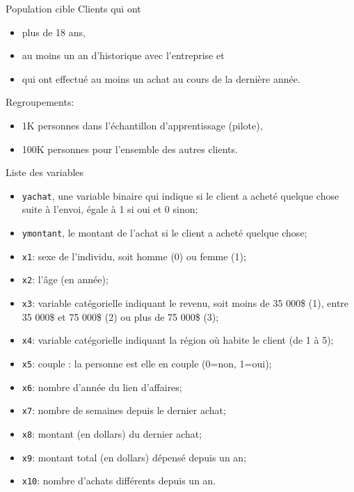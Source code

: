 \documentclass[
  ignorenonframetext,
]{beamer}
\providecommand{\tightlist}{%
  \setlength{\itemsep}{0pt}\setlength{\parskip}{0pt}}
\begin{document}
\begin{frame}{Population cible}
\protect{}\label{population-cible}
Clients qui ont

\begin{itemize}
\tightlist
\item
  plus de 18 ans,
\item
  au moins un an d'historique avec l'entreprise et
\item
  qui ont effectué au moins un achat au cours de la dernière année.
\end{itemize}

Regroupements:

\begin{itemize}
\tightlist
\item
  1K personnes dans l'échantillon d'apprentissage (pilote),
\item
  100K personnes pour l'ensemble des autres clients.
\end{itemize}
\end{frame}

\begin{frame}[fragile]{Liste des variables}
\protect{}\label{liste-des-variables}
\footnotesize

\begin{itemize}
\tightlist
\item
  \texttt{yachat}, une variable binaire qui indique si le client a
  acheté quelque chose suite à l'envoi, égale à 1 si oui et 0 sinon;
\item
  \texttt{ymontant}, le montant de l'achat si le client a acheté quelque
  chose;
\item
  \texttt{x1}: sexe de l'individu, soit homme (0) ou femme (1);
\item
  \texttt{x2}: l'âge (en année);
\item
  \texttt{x3}: variable catégorielle indiquant le revenu, soit moins de
  35 000\$ (1), entre 35 000\$ et 75 000\$ (2) ou plus de 75 000\$ (3);
\item
  \texttt{x4}: variable catégorielle indiquant la région où habite le
  client (de 1 à 5);
\item
  \texttt{x5}: couple : la personne est elle en couple (0=non, 1=oui);
\item
  \texttt{x6}: nombre d'année du lien d'affaires;
\item
  \texttt{x7}: nombre de semaines depuis le dernier achat;
\item
  \texttt{x8}: montant (en dollars) du dernier achat;
\item
  \texttt{x9}: montant total (en dollars) dépensé depuis un an;
\item
  \texttt{x10}: nombre d'achats différents depuis un an.
\end{itemize}

\normalsize
\end{frame}
\end{document}
